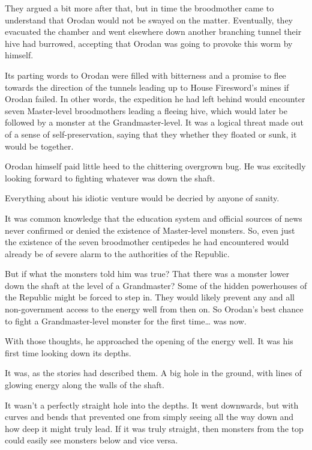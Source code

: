 \documentclass[a4paper,10pt]{book}
\begin{document}
They argued a bit more after that, but in time the broodmother came to understand that Orodan would not be swayed on the matter. Eventually, they evacuated the chamber and went elsewhere down another branching tunnel their hive had burrowed, accepting that Orodan was going to provoke this worm by himself.\par
Its parting words to Orodan were filled with bitterness and a promise to flee towards the direction of the tunnels leading up to House Firesword’s mines if Orodan failed. In other words, the expedition he had left behind would encounter seven Master-level broodmothers leading a fleeing hive, which would later be followed by a monster at the Grandmaster-level. It was a logical threat made out of a sense of self-preservation, saying that they whether they floated or sunk, it would be together.\par
Orodan himself paid little heed to the chittering overgrown bug. He was excitedly looking forward to fighting whatever was down the shaft.\par
Everything about his idiotic venture would be decried by anyone of sanity.\par
It was common knowledge that the education system and official sources of news never confirmed or denied the existence of Master-level monsters. So, even just the existence of the seven broodmother centipedes he had encountered would already be of severe alarm to the authorities of the Republic.\par
But if what the monsters told him was true? That there was a monster lower down the shaft at the level of a Grandmaster? Some of the hidden powerhouses of the Republic might be forced to step in. They would likely prevent any and all non-government access to the energy well from then on. So Orodan’s best chance to fight a Grandmaster-level monster for the first time… was now.\par
With those thoughts, he approached the opening of the energy well. It was his first time looking down its depths.\par
It was, as the stories had described them. A big hole in the ground, with lines of glowing energy along the walls of the shaft.\par
It wasn’t a perfectly straight hole into the depths. It went downwards, but with curves and bends that prevented one from simply seeing all the way down and how deep it might truly lead. If it was truly straight, then monsters from the top could easily see monsters below and vice versa.\par
\end{document}
